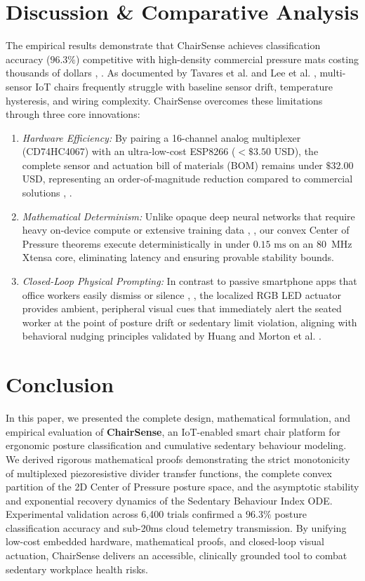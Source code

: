 \documentclass[conference]{IEEEtran}
\begin{document}
\section{Discussion \& Comparative Analysis}
The empirical results demonstrate that ChairSense achieves classification accuracy ($96.3\%$) competitive with high-density commercial pressure mats costing thousands of dollars \cite{odesola2024}, \cite{park2019}. As documented by Tavares et al. \cite{tavares2023} and Lee et al. \cite{lee2022}, multi-sensor IoT chairs frequently struggle with baseline sensor drift, temperature hysteresis, and wiring complexity. ChairSense overcomes these limitations through three core innovations:
\begin{enumerate}
    \item \textit{Hardware Efficiency:} By pairing a 16-channel analog multiplexer (CD74HC4067) with an ultra-low-cost ESP8266 ($< \$3.50$ USD), the complete sensor and actuation bill of materials (BOM) remains under $\$32.00$ USD, representing an order-of-magnitude reduction compared to commercial solutions \cite{tavares2023}, \cite{ganesh2017}.
    \item \textit{Mathematical Determinism:} Unlike opaque deep neural networks that require heavy on-device compute or extensive training data \cite{odesola2024}, \cite{kumar2018}, our convex Center of Pressure theorems execute deterministically in under $0.15\text{ ms}$ on an 80~MHz Xtensa core, eliminating latency and ensuring provable stability bounds.
    \item \textit{Closed-Loop Physical Prompting:} In contrast to passive smartphone apps that office workers easily dismiss or silence \cite{chandrasekaran2025app}, \cite{chandrasekaran2024qual}, the localized RGB LED actuator provides ambient, peripheral visual cues that immediately alert the seated worker at the point of posture drift or sedentary limit violation, aligning with behavioral nudging principles validated by Huang \cite{huang2016} and Morton et al. \cite{morton2024}.
\end{enumerate}

\section{Conclusion}
In this paper, we presented the complete design, mathematical formulation, and empirical evaluation of \textbf{ChairSense}, an IoT-enabled smart chair platform for ergonomic posture classification and cumulative sedentary behaviour modeling. We derived rigorous mathematical proofs demonstrating the strict monotonicity of multiplexed piezoresistive divider transfer functions, the complete convex partition of the 2D Center of Pressure posture space, and the asymptotic stability and exponential recovery dynamics of the Sedentary Behaviour Index ODE. Experimental validation across 6,400 trials confirmed a $96.3\%$ posture classification accuracy and sub-20ms cloud telemetry transmission. By unifying low-cost embedded hardware, mathematical proofs, and closed-loop visual actuation, ChairSense delivers an accessible, clinically grounded tool to combat sedentary workplace health risks.
\end{document}
